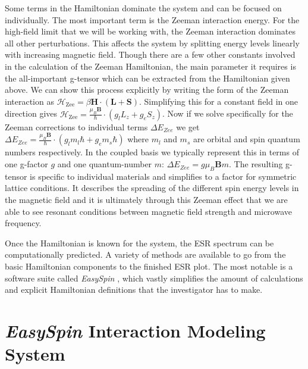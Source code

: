 \documentclass[oneside, noacknowlegments]{BYUPhys}
\begin{document}
Some terms in the Hamiltonian dominate the system and can be focused on individually. The most important term is the Zeeman interaction energy. For the high-field limit that we will be working with, the Zeeman interaction dominates all other perturbations. This affects the system by splitting energy levels linearly with increasing magnetic field. Though there are a few other constants involved in the calculation of the Zeeman Hamiltonian, the main parameter it requires is the all-important g-tensor which can be extracted from the Hamiltonian given above. We can show this process explicitly by writing the form of the Zeeman interaction as $\mathcal{H}_{\text{Zee}} = \beta \mathbf{H} \cdot (\mathbf{L}+\mathbf{S})$. Simplifying this for a constant field in one direction gives $\mathcal{H}_{\text{Zee}} = \frac{\mu_B\mathbf{B}}{\hbar}\cdot (g_l L_z+g_eS_z)$. Now if we solve specifically for the Zeeman corrections to individual terms $\Delta E_{Zee}$ we get $\Delta E_{Zee}=\frac{\mu_B\mathbf{B}}{\hbar}\cdot (g_lm_l\hbar+g_em_s\hbar)$ where $m_l$ and $m_s$ are orbital and spin quantum numbers respectively. In the coupled basis we typically represent this in terms of one g-factor $g$ and one quantum-number $m$: $\Delta E_{Zee}=g\mu_B\mathbf{B}m$. The resulting g-tensor is specific to individual materials and simplifies to a factor for symmetric lattice conditions. It describes the spreading of the different spin energy levels in the magnetic field and it is ultimately through this Zeeman effect that we are able to see resonant conditions between magnetic field strength and microwave frequency.

Once the Hamiltonian is known for the system, the ESR spectrum can be computationally predicted. A variety of methods are available to go from the basic Hamiltonian components to the finished ESR plot. The most notable is a software suite called \textit{EasySpin} \cite{RefWorks:doc:58929a02e4b0d4c09201f91b}, which vastly simplifies the amount of calculations and explicit Hamiltonian definitions that the investigator has to make.

\section{\textit{EasySpin} Interaction Modeling System}
\end{document}
